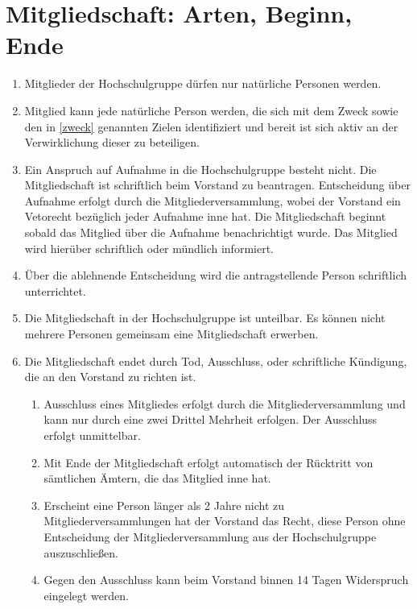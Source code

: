 \documentclass[11pt]{article}
\begin{document}
	\section{Mitgliedschaft: Arten, Beginn, Ende}
	\begin{enumerate}
		\item Mitglieder der Hochschulgruppe dürfen nur natürliche Personen werden.
        \item Mitglied kann jede natürliche Person werden, die sich mit dem Zweck sowie den in \ref{zweck} genannten Zielen identifiziert und bereit ist sich aktiv an der Verwirklichung dieser zu beteiligen.
		\item Ein Anspruch auf Aufnahme in die Hochschulgruppe besteht nicht. Die Mitgliedschaft ist
		schriftlich beim Vorstand zu beantragen. Entscheidung über Aufnahme erfolgt durch die Mitgliederversammlung, wobei der Vorstand ein Vetorecht bezüglich jeder Aufnahme inne hat. Die Mitgliedschaft beginnt sobald das Mitglied über die Aufnahme benachrichtigt wurde. Das Mitglied wird hierüber schriftlich oder mündlich informiert.
		\item Über die ablehnende Entscheidung wird die antragstellende Person schriftlich unterrichtet.
		\item Die Mitgliedschaft in der Hochschulgruppe ist unteilbar. Es können nicht mehrere Personen
		gemeinsam eine Mitgliedschaft erwerben.
		\item Die Mitgliedschaft endet durch Tod, Ausschluss, oder schriftliche Kündigung, die an den Vorstand zu richten ist.
		\begin{enumerate}
			\item Ausschluss eines Mitgliedes erfolgt durch die Mitgliederversammlung und kann nur durch eine zwei Drittel Mehrheit erfolgen. Der Ausschluss erfolgt unmittelbar.
			\item Mit Ende der Mitgliedschaft erfolgt automatisch der Rücktritt von sämtlichen Ämtern, die das Mitglied inne hat.
            \item Erscheint eine Person länger als 2 Jahre nicht zu Mitgliederversammlungen hat der Vorstand das Recht, diese Person ohne Entscheidung der Mitgliederversammlung aus der Hochschulgruppe auszuschließen.
            \item Gegen den Ausschluss kann beim Vorstand binnen 14 Tagen Widerspruch eingelegt werden.
		\end{enumerate}
	\end{enumerate}
\end{document}
